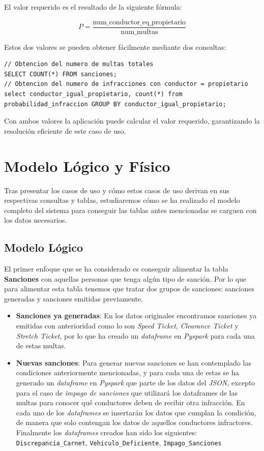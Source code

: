 \documentclass[]{article}
\begin{document}
\begin{itemize}
    El valor requerido es el resultado de la siguiente fórmula: 

    $$P = \frac{\text{num\_conductor\_eq\_propietario}}{\text{num\_multas}}$$

    Estos dos valores se pueden obtener fácilmente mediante dos consultas:

    \begin{lstlisting}[language=cql, caption=Querys para el caso de uso 3]
// Obtencion del numero de multas totales
SELECT COUNT(*) FROM sanciones;
// Obtencion del numero de infracciones con conductor = propietario
select conductor_igual_propietario, count(*) from probabilidad_infraccion GROUP BY conductor_igual_propietario;
    \end{lstlisting}
\end{itemize}

    Con ambos valores la aplicación puede calcular el valor requerido, garantizando la resolución eficiente de este caso de uso.

\section{Modelo Lógico y Físico}
\label{sec:modelo_logico_fisico}
Tras presentar los casos de uso y cómo estos casos de uso derivan en sus
respectivas consultas y tablas, estudiaremos cómo se ha realizado el modelo
completo del sistema para conseguir las tablas antes mencionadas se carguen con
los datos necesarios.

\subsection{Modelo Lógico}

El primer enfoque que se ha considerado es conseguir alimentar la tabla \textbf{Sanciones} con aquellas personas que tenga algún tipo de sanción. Por lo que para alimentar esta tabla tenemos que tratar dos grupos de sanciones: sanciones generadas y sanciones emitidas previamente.
\begin{itemize}
    \item \textbf{Sanciones ya generadas}: En los datos originales encontramos sanciones ya emitidas con anterioridad como lo son \textit{Speed Ticket}, \textit{Clearance Ticket} y \textit{Stretch Ticket}, por lo que ha creado un \textit{dataframe} en \textit{Pyspark} para cada una de estas multas.
    \item \textbf{Nuevas sanciones}: Para generar nuevas sanciones se han contemplado las condiciones anteriormente mencionadas, y para cada una de estas se ha generado un \textit{dataframe} en \textit{Pyspark} que parte de los datos del \textit{JSON}, excepto para el caso de \textit{impago de sanciones} que utilizará los dataframes de las multas para conocer qué conductores deben de recibir otra infracción. En cada uno de los \textit{dataframes} se insertarán los datos que cumplan la condición, de manera que solo contengan los datos de aquellos conductores infractores. Finalmente los \textit{dataframes} creados han sido los siguientes: \texttt{Discrepancia\_Carnet}, \texttt{Vehiculo\_Deficiente}, \texttt{Impago\_Sanciones}
\end{itemize}
\end{document}

